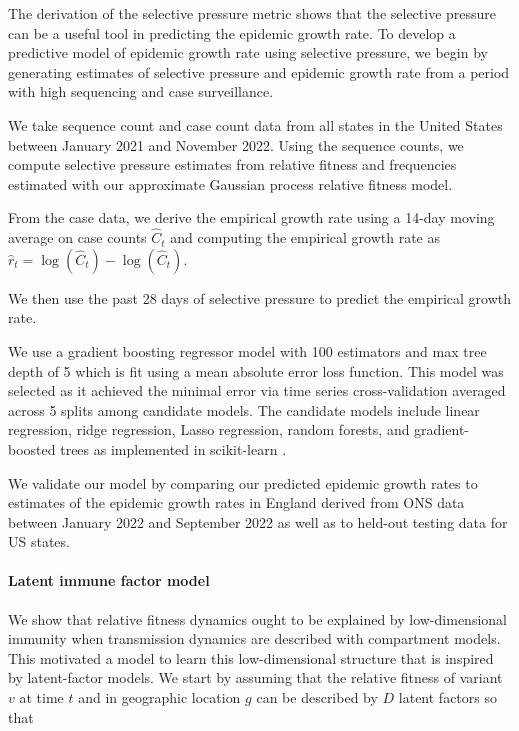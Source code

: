 \documentclass[11pt,oneside,letterpaper]{article}
\begin{document}
The derivation of the selective pressure metric shows that the selective pressure can be a useful tool in predicting the epidemic growth rate.
To develop a predictive model of epidemic growth rate using selective pressure, we begin by generating estimates of selective pressure and epidemic growth rate from a period with high sequencing and case surveillance.

We take sequence count and case count data from all states in the United States between January 2021 and November 2022.
Using the sequence counts, we compute selective pressure estimates from relative fitness and frequencies estimated with our approximate Gaussian process relative fitness model.

From the case data, we derive the empirical growth rate using a 14-day moving average on case counts $\hat{C}_{t}$ and computing the empirical growth rate as $\hat{r}_{t} = \log(\hat{C}_{t}) - \log(\hat{C}_{t})$.

We then use the past 28 days of selective pressure to predict the empirical growth rate.

We use a gradient boosting regressor model with 100 estimators and max tree depth of 5 which is fit using a mean absolute error loss function.
This model was selected as it achieved the minimal error via time series cross-validation averaged across 5 splits among candidate models.
The candidate models include linear regression, ridge regression, Lasso regression, random forests, and gradient-boosted trees as implemented in scikit-learn \cite{scikit-learn}.

We validate our model by comparing our predicted epidemic growth rates to estimates of the epidemic growth rates in England derived from ONS data between January 2022 and September 2022 as well as to held-out testing data for US states.

\paragraph{Latent immune factor model}%

We show that relative fitness dynamics ought to be explained by low-dimensional immunity when transmission dynamics are described with compartment models.
This motivated a model to learn this low-dimensional structure that is inspired by latent-factor models.
We start by assuming that the relative fitness of variant $v$ at time $t$ and in geographic location $g$ can be described by $D$ latent factors so that
\end{document}
